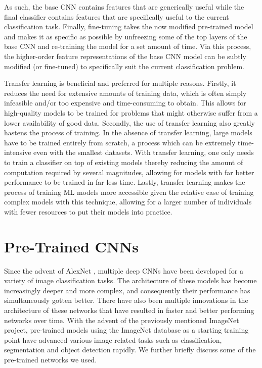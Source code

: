 As such, the base CNN contains features that are generically useful while the final classifier contains features that are specifically useful to the current classification task. Finally, fine-tuning takes the now modified pre-trained model and makes it as specific as possible by unfreezing some of the top layers of the base CNN and re-training the model for a set amount of time. Via this process, the higher-order feature representations of the base CNN model can be subtly modified (or fine-tuned) to specifically suit the current classification problem. 

Transfer learning is beneficial and preferred for multiple reasons. Firstly, it reduces the need for extensive amounts of training data, which is often simply infeasible and/or too expensive and time-consuming to obtain. This allows for high-quality models to be trained for problems that might otherwise suffer from a lower availability of good data. Secondly, the use of transfer learning also greatly hastens the process of training. In the absence of transfer learning, large models have to be trained entirely from scratch, a process which can be extremely time-intensive even with the smallest datasets. With transfer learning, one only needs to train a classifier on top of existing models thereby reducing the amount of computation required by several magnitudes, allowing for models with far better performance to be trained in far less time. Lastly, transfer learning makes the process of training ML models more accessible given the relative ease of training complex models with this technique, allowing for a larger number of individuals with fewer resources to put their models into practice. 

\section{Pre-Trained CNNs}
Since the advent of AlexNet  \cite{17}, multiple deep CNNs have been developed for a variety of image classification tasks. The architecture of these models has become increasingly deeper and more complex, and consequently their performance has simultaneously gotten better. There have also been multiple innovations in the architecture of these networks that have resulted in faster and better performing networks over time. With the advent of the previously mentioned ImageNet project, pre-trained models using the ImageNet database as a starting training point have advanced various image-related tasks such as classification, segmentation and object detection rapidly. We further briefly discuss some of the pre-trained networks we used.

